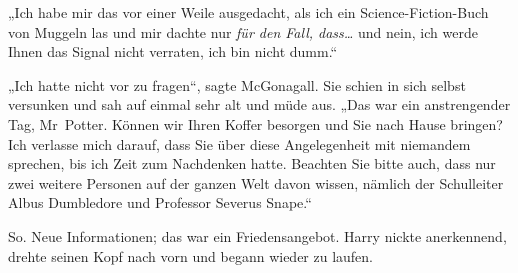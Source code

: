 „Ich habe mir das vor einer Weile ausgedacht, als ich ein Science-Fiction-Buch von Muggeln las und mir dachte nur \emph{für den Fall, dass…} und nein, ich werde Ihnen das Signal nicht verraten, ich bin nicht dumm.“

„Ich hatte nicht vor zu fragen“, sagte McGonagall. Sie schien in sich selbst versunken und sah auf einmal sehr alt und müde aus. „Das war ein anstrengender Tag, Mr~Potter. Können wir Ihren Koffer besorgen und Sie nach Hause bringen? Ich verlasse mich darauf, dass Sie über diese Angelegenheit mit niemandem sprechen, bis ich Zeit zum Nachdenken hatte. Beachten Sie bitte auch, dass nur zwei weitere Personen auf der ganzen Welt davon wissen, nämlich der Schulleiter Albus Dumbledore und Professor Severus Snape.“

So. Neue Informationen; das war ein Friedensangebot. Harry nickte anerkennend, drehte seinen Kopf nach vorn und begann wieder zu laufen.

